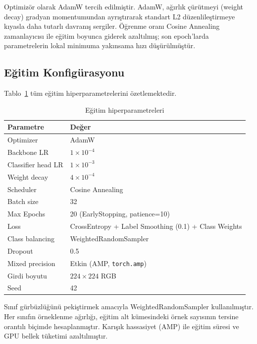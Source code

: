 \documentclass[conference]{IEEEtran}
\begin{document}
Optimizör olarak AdamW \cite{adamw} tercih edilmiştir. AdamW, ağırlık
çürütmeyi (weight decay) gradyan momentumundan ayrıştırarak standart
L2 düzenlileştirmeye kıyasla daha tutarlı davranış sergiler.
Öğrenme oranı Cosine Annealing zamanlayıcısı ile eğitim boyunca
giderek azaltılmış; son epoch'larda parametrelerin lokal minimuma
yakınsama hızı düşürülmüştür.

\subsection{Eğitim Konfigürasyonu}

Tablo~\ref{tab:hyper} tüm eğitim hiperparametrelerini özetlemektedir.

\begin{table}[h]
\caption{Eğitim hiperparametreleri}
\label{tab:hyper}
\centering
\small
\begin{tabular}{ll}
\toprule
\textbf{Parametre} & \textbf{Değer} \\
\midrule
Optimizer            & AdamW \\
Backbone LR          & $1\times10^{-4}$ \\
Classifier head LR   & $1\times10^{-3}$ \\
Weight decay         & $4\times10^{-4}$ \\
Scheduler            & Cosine Annealing \\
Batch size           & 32 \\
Max Epochs           & 20 (EarlyStopping, patience=10) \\
Loss                 & CrossEntropy + Label Smoothing (0.1) + Class Weights \\
Class balancing      & WeightedRandomSampler \\
Dropout              & 0.5 \\
Mixed precision      & Etkin (AMP, \texttt{torch.amp}) \\
Girdi boyutu         & $224\times224$ RGB \\
Seed                 & 42 \\
\bottomrule
\end{tabular}
\end{table}

Sınıf gürbüzlüğünü pekiştirmek amacıyla WeightedRandomSampler
kullanılmıştır. Her sınıfın örneklenme ağırlığı, eğitim alt kümesindeki
örnek sayısının tersine orantılı biçimde hesaplanmıştır. Karışık hassasiyet
(AMP) ile eğitim süresi ve GPU bellek tüketimi azaltılmıştır.
\end{document}
